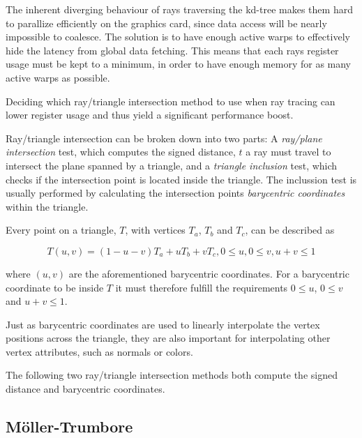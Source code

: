 The inherent diverging behaviour of rays traversing the kd-tree makes them hard
to parallize efficiently on the graphics card, since data access will be nearly
impossible to coalesce. The solution is to have enough active warps to
effectively hide the latency from global data fetching. This means that each
rays register usage must be kept to a minimum, in order to have enough memory
for as many active warps as possible.

Deciding which ray/triangle intersection method to use when ray tracing can
lower register usage and thus yield a significant performance boost.


Ray/triangle intersection can be broken down into two parts: A \textit{ray/plane
  intersection} test, which computes the signed distance, $t$ a ray must travel
to intersect the plane spanned by a triangle, and a \textit{triangle inclusion}
test, which checks if the intersection point is located inside the triangle. The
inclussion test is usually performed by calculating the intersection points
\textit{barycentric coordinates} within the triangle.

Every point on a triangle, $T$, with vertices $T_a$, $T_b$ and $T_c$, can be described
as

\begin{displaymath}
  T(u,v) = (1-u-v)T_a + uT_b + vT_c, 0 \le u, 0 \le v, u+v \le 1
\end{displaymath}
 
where $(u, v)$ are the aforementioned barycentric coordinates. For a barycentric
coordinate to be inside $T$ it must therefore fulfill the requirements $0 \le
u$, $0 \le v$ and $u+v \le 1$.

Just as barycentric coordinates are used to linearly interpolate the vertex
positions across the triangle, they are also important for interpolating other
vertex attributes, such as normals or colors.

The following two ray/triangle intersection methods both compute the signed
distance and barycentric coordinates.

\subsection{Möller-Trumbore}


